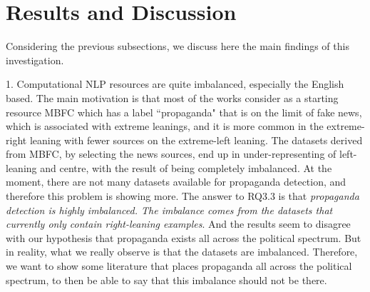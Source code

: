 \section{Results and Discussion}
\label{ssec:ps_prop_leaning_imbalanced_discussion}

Considering the previous subsections, we discuss here the main findings of this investigation.




1. Computational NLP resources are quite imbalanced, especially the English based. The main motivation is that most of the works consider as a starting resource MBFC which has a label ``propaganda" that is on the limit of fake news, which is associated with extreme leanings, and it is more common in the extreme-right leaning with fewer sources on the extreme-left leaning. The datasets derived from MBFC, by selecting the news sources, end up in under-representing of left-leaning and centre, with the result of being completely imbalanced.
At the moment, there are not many datasets available for propaganda detection, and therefore this problem is showing more.
The answer to RQ3.3 is that \emph{propaganda detection is highly imbalanced. The imbalance comes from the datasets that currently only contain right-leaning examples}.
And the results seem to disagree with our hypothesis that propaganda exists all across the political spectrum.
But in reality, what we really observe is that the datasets are imbalanced. Therefore, we want to show some literature that places propaganda all across the political spectrum, to then be able to say that this imbalance should not be there.


